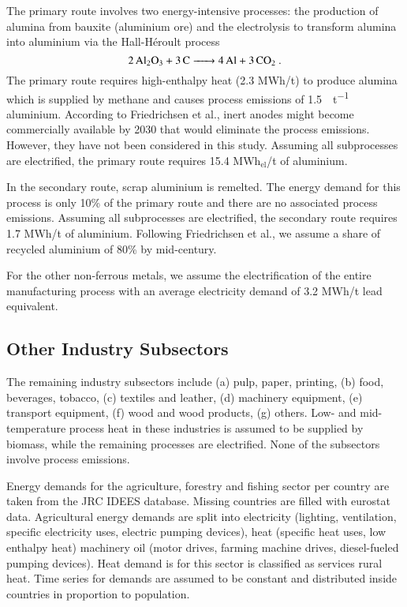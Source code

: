 The primary route involves two energy-intensive processes: the production of
alumina from bauxite (aluminium ore) and the electrolysis to transform alumina
into aluminium via the  Hall-H\'{e}roult process
\begin{equation}
    \ce{2Al2O3 + 3C -> 4Al + 3\co}.
\end{equation}
The primary route requires high-enthalpy heat (2.3 MWh/t) to produce alumina
which is supplied by methane and causes process emissions of
\SI{1.5}{\tco\per\tonne} aluminium. According to Friedrichsen et al.,
inert anodes might become commercially available by 2030 that would eliminate
the process emissions. However, they have not been considered in this study.
Assuming all subprocesses are electrified, the primary route requires 15.4
MWh$_{\text{el}}$/t of aluminium.

In the secondary route, scrap aluminium is remelted. The energy demand for this
process is only 10\% of the primary route and there are no associated process
emissions. Assuming all subprocesses are electrified, the secondary route
requires 1.7 MWh/t of aluminium. Following Friedrichsen et al., we assume
a share of recycled aluminium of 80\% by mid-century.

For the other non-ferrous metals, we assume the electrification of the entire
manufacturing process with an average electricity demand of 3.2 MWh\el/t lead
equivalent.

\subsection{Other Industry Subsectors}
\label{sec:si:industry:other}

The remaining industry subsectors include (a) pulp, paper, printing, (b) food,
beverages, tobacco, (c) textiles and leather, (d) machinery equipment, (e)
transport equipment, (f) wood and wood products, (g) others. Low- and
mid-temperature process heat in these industries is assumed to be supplied by
biomass, while the remaining processes are
electrified. None of the subsectors involve process emissions.

Energy demands for the agriculture, forestry and fishing sector per country are
taken from the JRC IDEES database. Missing countries are filled
with eurostat data. Agricultural energy
demands are split into electricity (lighting, ventilation, specific electricity
uses, electric pumping devices), heat (specific heat uses, low enthalpy heat)
machinery oil (motor drives, farming machine drives, diesel-fueled pumping
devices). Heat demand is for this sector is classified as services rural heat.
Time series for demands are assumed to be constant and distributed inside
countries in proportion to population.


